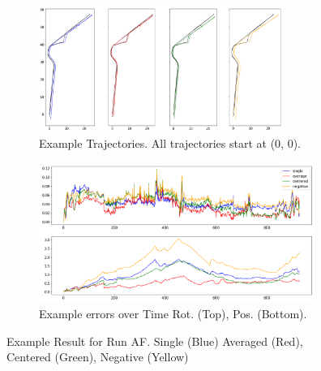 \documentclass[conference]{IEEEtran}
\begin{document}

\begin{figure}[ht]
    \centering
    \begin{subfigure}[b]{0.45\linewidth}
        \centering
        \includegraphics[width=8cm]{figures/example_trajectory.png}
        \caption{Example Trajectories. All trajectories start at (0, 0).}
        \label{fig:posyaw_af}
    \end{subfigure}
    \begin{subfigure}[b]{0.45\linewidth}
        \centering
        \includegraphics[width=9cm]{figures/example_error.png}
        \caption{Example errors over Time Rot. (Top), Pos. (Bottom).}
        \label{fig:error_af}
    \end{subfigure}
\caption{Example Result for Run AF. Single (Blue) Averaged (Red), Centered (Green), Negative (Yellow)}
\label{fig:real_example}
\end{figure}
\end{document}
